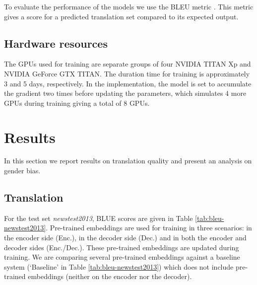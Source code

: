 \documentclass[11pt,a4paper]{article}
\begin{document}

To evaluate the performance of the models we use the BLEU metric \cite{papineni2002}. This metric gives a score for a predicted translation set compared to its expected output.

\subsection{Hardware resources}


The GPUs used for training are separate groups of four NVIDIA TITAN Xp and NVIDIA GeForce GTX TITAN. The duration time for training is approximately 3 and 5 days, respectively. In the implementation, the model is set to accumulate the gradient two times before updating the parameters, which simulates 4 more GPUs during training giving a total of 8 GPUs.%


\section{Results}
\label{sec:results}



In this section we report results on translation quality and present an analysis on gender bias.
 
 
\subsection{Translation} 
 
For the test set \textit{newstest2013}, BLUE scores are given in Table \ref{tab:bleu-newstest2013}. 
Pre-trained embeddings are used for training in three scenarios: in the encoder side (Enc.), in the decoder side (Dec.) and in both the encoder and decoder sides (Enc./Dec.). 
These pre-trained embeddings are updated during training. 
We are comparing several pre-trained embeddings against a baseline system (`Baseline' in Table \ref{tab:bleu-newstest2013}) which does not include pre-trained embeddings (neither on the encoder nor the decoder).

\end{document}
